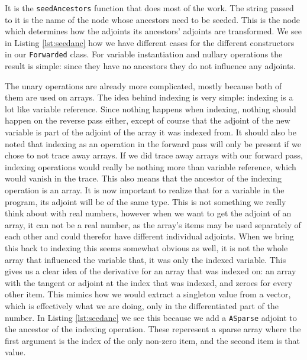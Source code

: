         It is the \texttt{seedAncestors} function that does most of the work.
        The string passed to it is the name of the node whose ancestors need to be seeded.
        This is the node which determines how the adjoints its ancestors' adjoints are transformed.
        We see in Listing \ref{lst:seedanc} how we have different cases for the different constructors in our \texttt{Forwarded} class.
        For variable instantiation and nullary operations the result is simple: since they have no ancestors they do not influence any adjoints.
        
        The unary operations are already more complicated, mostly because both of them are used on arrays.
        The idea behind indexing is very simple: indexing is a lot like variable reference.
        Since nothing happens when indexing, nothing should happen on the reverse pass either, except of course that the adjoint of the new variable is part of the adjoint of the array it was indexed from.
        It should also be noted that indexing as an operation in the forward pass will only be present if we chose to not trace away arrays.
        If we did trace away arrays with our forward pass, indexing operations would really be nothing more than variable reference, which would vanish in the trace.
        This also means that the ancestor of the indexing operation is an array.
        It is now important to realize that for a variable in the program, its adjoint will be of the same type.
        This is not something we really think about with real numbers, however when we want to get the adjoint of an array, it can not be a real number, as the array's items may be used separately of each other and could therefor have different individual adjoints.
        When we bring this back to indexing this seems somewhat obvious as well, it is not the whole array that influenced the variable that, it was only the indexed variable.
        This gives us a clear idea of the derivative for an array that was indexed on: an array with the tangent or adjoint at the index that was indexed, and zeroes for every other item.
        This mimics how we would extract a singleton value from a vector, which is effectively what we are doing, only in the differentiated part of the number.
        In Listing \ref{lst:seedanc} we see this because we add a \texttt{ASparse} adjoint to the ancestor of the indexing operation.
        These reperesent a sparse array where the first argument is the index of the only non-zero item, and the second item is that value.

